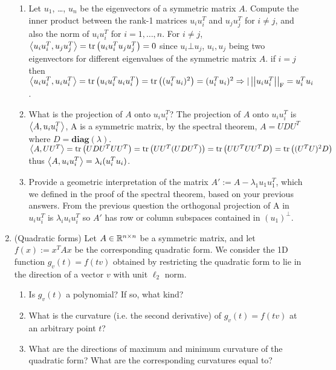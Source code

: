 \documentclass[12pt,twoside]{article}
\begin{document}
\begin{enumerate}
\begin{enumerate}
\item Let $u_1$, \ldots, $u_n$ be the eigenvectors of a symmetric matrix $A$. Compute the inner product between the rank-1 matrices $u_iu_i^T$ and $u_ju_j^T$ for $i \neq j$, and also the norm of $u_iu_i^T$ for $i=1,\ldots,n$. 
For $i \neq j$, $\left \langle u_iu_i^T, u_ju_j^T\right \rangle = \operatorname{tr}\left( u_iu_i^Tu_ju_j^T \right) = 0$ since $u_i \bot u_j$, $u_i, u_j$ being two eigenvectors for different eigenvalues of the symmetric matrix $A$.
if $i=j$ then  $\left \langle u_iu_i^T, u_iu_i^T\right \rangle = \operatorname{tr}\left( u_iu_i^Tu_iu_i^T \right) = \operatorname{tr}\left( (u_i^Tu_i)^2 \right) = (u_i^Tu_i)^2 \Rightarrow |\left|\left| u_i u_i^T \right|\right| _{\operatorname{F}} =  u_i^Tu_i$.
\item What is the projection of $A$ onto $u_iu_i^T$?
The projection of $A$ onto $u_iu_i^T$ is $\left \langle A, u_iu_i^T\right \rangle$, A is a symmetric matrix, by the spectral theorem, $A=U D U^T$ where $D=\textbf{diag}(\lambda)$.
$\left \langle A, UU^T\right \rangle = \operatorname{tr}\left( U D U^T UU^T \right) = \operatorname{tr}\left( UU^T (U D U^T) \right) = \operatorname{tr}\left( UU^TUU^TD \right) = \operatorname{tr}\left( (U^TU)^2D \right)$
thus $\left \langle A, u_iu_i^T\right \rangle=\lambda_i (u_i^Tu_i)$.
\item Provide a geometric interpretation of the matrix $A':=A-\lambda_1 u_1u_1^T$, which we defined in the proof of the spectral theorem, based on your previous answers.
From the previous question the orthogonal projection of A in $u_iu_i^T$ is $\lambda_i u_iu_i^T$ so $A'$ has row or column subspaces contained in  $(u_1)^\bot$.

\end{enumerate}

\item (Quadratic forms) Let $A\in \mathbb{R}^{n \times n}$ be a symmetric matrix, and let $f(x):=x^TAx$ be the corresponding quadratic form. We consider the 1D function $g_{v}(t)=f(tv)$ obtained by restricting the quadratic form to lie in the direction of a vector $v$ with unit $\ell_2$ norm.
\begin{enumerate}
\item Is $g_{v}(t)$ a polynomial? If so, what kind?
\item What is the curvature (i.e. the second derivative) of $g_{v}(t)=f(tv)$ at an arbitrary point $t$?
\item What are the directions of maximum and minimum curvature of the quadratic form? What are the corresponding curvatures equal to?
\end{enumerate}


\end{enumerate}
\end{document}
